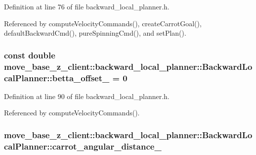 Definition at line 76 of file backward\+\_\+local\+\_\+planner.\+h.



Referenced by compute\+Velocity\+Commands(), create\+Carrot\+Goal(), default\+Backward\+Cmd(), pure\+Spinning\+Cmd(), and set\+Plan().

\subsubsection[{\texorpdfstring{betta\+\_\+offset\+\_\+}{betta_offset_}}]{\setlength{\rightskip}{0pt plus 5cm}const double move\+\_\+base\+\_\+z\+\_\+client\+::backward\+\_\+local\+\_\+planner\+::\+Backward\+Local\+Planner\+::betta\+\_\+offset\+\_\+ = 0\hspace{0.3cm}{\ttfamily [private]}}\hypertarget{classmove__base__z__client_1_1backward__local__planner_1_1BackwardLocalPlanner_ae35f99afc3c859a4b14d0417ef7839df}{}\label{classmove__base__z__client_1_1backward__local__planner_1_1BackwardLocalPlanner_ae35f99afc3c859a4b14d0417ef7839df}


Definition at line 90 of file backward\+\_\+local\+\_\+planner.\+h.



Referenced by compute\+Velocity\+Commands().

\subsubsection[{\texorpdfstring{carrot\+\_\+angular\+\_\+distance\+\_\+}{carrot_angular_distance_}}]{ move\+\_\+base\+\_\+z\+\_\+client\+::backward\+\_\+local\+\_\+planner\+::\+Backward\+Local\+Planner\+::carrot\+\_\+angular\+\_\+distance\+\_\+\hspace{0.3cm}{\ttfamily [private]}}\hypertarget{classmove__base__z__client_1_1backward__local__planner_1_1BackwardLocalPlanner_a3d6cba0748b85a67f5dfd7740de9530f}{}\label{classmove__base__z__client_1_1backward__local__planner_1_1BackwardLocalPlanner_a3d6cba0748b85a67f5dfd7740de9530f}



